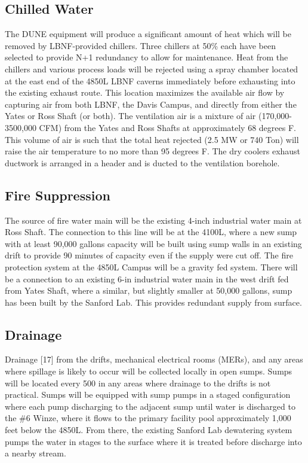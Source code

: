 \subsection{Chilled Water}
\label{sec:fscf-und-ch-h2o}

The DUNE equipment will produce a significant amount of heat which will be removed by LBNF-provided chillers. Three chillers at 50\% each have been selected to provide N+1 redundancy to allow for maintenance. Heat from the chillers and various process loads will be rejected using a spray chamber located at the east end of the 4850L LBNF caverns immediately before exhausting into the existing exhaust route. This location maximizes the available air flow by capturing air from both LBNF, the Davis Campus, and directly from either the Yates or Ross Shaft (or both).  The ventilation air is a mixture of air (170,000-3500,000 CFM) from the Yates and Ross Shafts at approximately 68 degrees F. This volume of air is such that the total heat rejected (2.5 MW or 740 Ton) will raise the air temperature to no more than 95 degrees F. The dry coolers exhaust ductwork is arranged in a header and is ducted to the ventilation borehole.

\subsection{Fire Suppression}
\label{sec:fscf-und-fire-supp}

The source of fire water main will be the existing 4-inch industrial water main at Ross Shaft. The connection to this line will be at the 4100L, where a new sump with at least 90,000 gallons capacity will be built using sump walls in an existing drift to provide 90 minutes of capacity even if the supply were cut off. The fire protection system at the 4850L Campus will be a gravity fed system. There will be a connection to an existing 6-in industrial water main in the west drift fed from Yates Shaft, where a similar, but slightly smaller at 50,000 gallons, sump has been built by the Sanford Lab. This provides redundant supply from surface.

\subsection{Drainage}
\label{sec:fscf-und-drain}

Drainage [17] from the drifts, mechanical electrical rooms (MERs), and any areas where spillage is likely to occur will be collected locally in open sumps. Sumps will be located every 500 in any areas where drainage to the drifts is not practical. Sumps will be equipped with sump pumps in a staged configuration where each pump discharging to the adjacent sump until water is discharged to the \#6 Winze, where it flows to the primary facility pool approximately 1,000 feet below the 4850L. From there, the existing Sanford Lab dewatering system pumps the water in stages to the surface where it is treated before discharge into a nearby stream.

